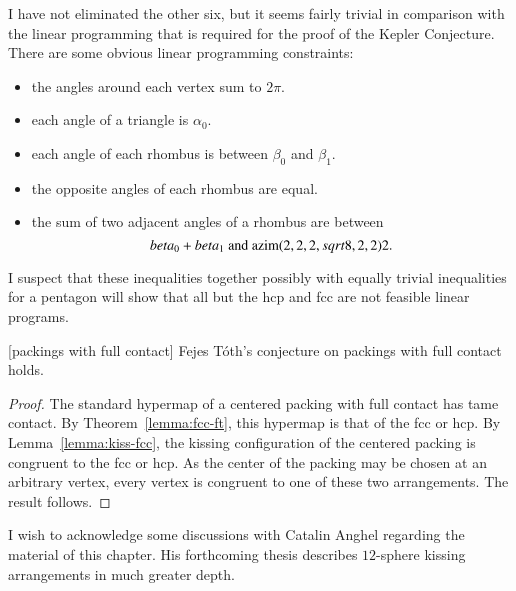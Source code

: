 \begin{note}%
I have not eliminated the other six, but it seems fairly trivial in comparison with the linear programming that is required for the proof of the Kepler Conjecture.  There are some obvious linear programming constraints:
\begin{itemize}
\item the angles around each vertex sum to $2\pi$.
\item each angle of a triangle is $\alpha_0$.
\item each angle of each rhombus is between $\beta_0$ and $\beta_1$.
\item the opposite angles of each rhombus are equal.
\item the sum of two adjacent angles of a rhombus are between
$$
beta_0 + beta_1 \hbox{ and } {\operatorname{azim}}(2,2,2,sqrt8,2,2)2.
$$
\end{itemize}
I suspect that these inequalities together possibly with equally trivial inequalities for a pentagon will show that all but the hcp and fcc are not feasible linear programs.
\end{note}

\begin{theorem}[packings with full contact]  
Fejes T\'oth's conjecture on packings with full contact holds.
\end{theorem}

\begin{proof} The standard hypermap of a centered packing with full contact has tame contact.  By Theorem~\ref{lemma:fcc-ft}, this hypermap is that of the fcc or hcp.  By Lemma~\ref{lemma:kiss-fcc}, the kissing configuration of the centered packing is congruent to the fcc or hcp.  As the center of the packing may be chosen at an arbitrary vertex, every vertex is congruent to one of these two arrangements.  The result follows.
\end{proof}

\begin{note}%
I wish to acknowledge some discussions with Catalin Anghel regarding the material of this chapter.  His forthcoming thesis describes $12$-sphere kissing arrangements in much greater depth.
\end{note}
